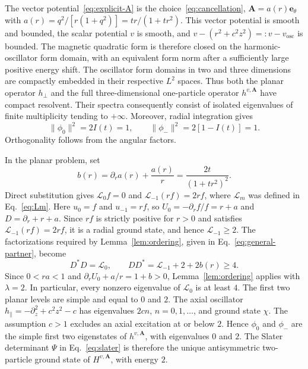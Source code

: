 \documentclass[11pt,a4paper]{article}
\theoremstyle{remark}
\theoremstyle{plain}
\newcommand{\A}{\mathbf A}
\newcommand{\ee}{\mathbf e_\theta}
\begin{document}
The vector potential~\eqref{eq:explicit-A} is the
choice~\eqref{eq:cancellation}, $\A=a(r)\ee$ with
$a(r)=q^2/[r(1+q^2)]=tr/(1+tr^2)$. 
This vector potential is smooth and bounded, the scalar
potential $v$ is smooth, and
$v-(r^2+c^2z^2)=: v -v_\mathrm{osc} $ is bounded. The magnetic quadratic form is therefore
closed on the harmonic-oscillator form domain, with an equivalent
form norm after a sufficiently large positive energy shift.
The oscillator form domains
in two and three dimensions are compactly embedded in their respective
$L^2$ spaces. Thus both the planar operator $h_\perp$ and the full
three-dimensional one-particle operator $h^{v,\A}$ have compact
resolvent. Their spectra consequently consist of isolated eigenvalues
of finite multiplicity tending to $+\infty$. 
Moreover, radial integration gives
\begin{equation*}
 \|\phi_0\|^2=2I(t)=1,\qquad
 \|\phi_-\|^2=2[1-I(t)]=1.
\end{equation*}
Orthogonality follows from the angular factors.

In the planar problem, set
\begin{equation*}
 b(r)=\partial_ra(r)+\frac{a(r)}r=\frac{2t}{(1+tr^2)^2}.
\end{equation*}
Direct substitution gives $\mathcal L_0f=0$ and $\mathcal L_{-1}(rf)=2rf$,
where $\mathcal L_m$ was defined in Eq.~\eqref{eq:Lm}.
Here $u_0=f$ and $u_{-1}=rf$, so $U_0=-\partial_rf/f=r+a$ and
$D=\partial_r+r+a$. Since $rf$ is strictly positive for $r>0$ and
satisfies $\mathcal L_{-1}(rf)=2rf$, it is a radial ground state,
and hence $\mathcal L_{-1}\ge2$. The factorizations required by
Lemma~\ref{lem:ordering}, given in Eq.~\eqref{eq:general-partner}, become
\begin{equation*}
 D^*D=\mathcal L_0,\qquad DD^*=\mathcal L_{-1}+2+2b(r)\ge4.
\end{equation*}
Since $0<ra<1$ and $\partial_rU_0+a/r=1+b>0$,
Lemma~\ref{lem:ordering} applies with $\lambda=2$. In particular,
every nonzero eigenvalue of $\mathcal L_0$ is at least $4$. The first two planar
levels are simple and equal to $0$ and $2$. The axial oscillator
$h_\parallel=-\partial_z^2+c^2z^2-c$ has eigenvalues $2cn$,
$n=0,1,\ldots$, and ground state $\chi$.
The assumption $c>1$ excludes an axial excitation at or below $2$.
Hence $\phi_0$ and $\phi_-$ are the simple first two eigenstates of
$h^{v,\A}$, with eigenvalues $0$ and $2$. The Slater determinant $\Psi$ in
Eq.~\eqref{eq:slater} is therefore the unique antisymmetric
two-particle ground state of $H^{v,\A}$, with energy $2$.
\end{document}
